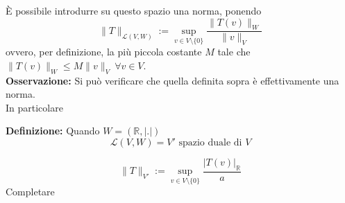 \documentclass[a4paper]{article}
\newcommand{\R}{\mathbb{R}}
\begin{document}
È possibile introdurre su questo spazio una norma, ponendo 
\[\|T\|_{\mathcal L(V,W)}:=\sup_{v\in V\setminus \{0\} }\frac{\|T(v)\|_W}{\|v\|_V}\]
ovvero, per definizione, la più piccola costante $M$ tale che $\|T(v)\|_W\le M \|v\|_V\ \forall v\in V$.
\\\textbf{Osservazione:} Si può verificare che quella definita sopra è effettivamente una norma.\\
In particolare
\begin{tcolorbox}
	\textbf{Definizione: }Quando $W=(\R,|.|)$ 
	\[\mathcal L (V,W)=V'\text{ spazio duale di }V\]
\end{tcolorbox}
\[\|T\|_{V'}:=\sup_{v\in V\setminus \{0\} } \frac{|T(v)|_{\R}}{a}\]
Completare
\end{document}
